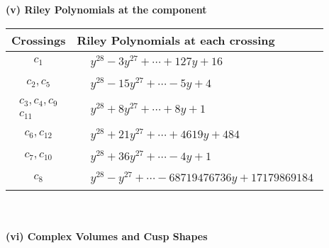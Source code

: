 \documentclass[1p]{elsarticle_modified}
\theoremstyle{definition}
\begin{document}
\newpage\renewcommand{\arraystretch}{1}
\flushleft \textbf{(v) Riley Polynomials at the component}\newline \\
\begin{tabular}{m{50pt}|m{274pt}}
Crossings & \hspace{64pt}Riley Polynomials at each crossing \\
\hline $$\begin{aligned}c_{1}\end{aligned}$$&$\begin{aligned}
&y^{28}-3 y^{27}+\cdots+127 y+16
\end{aligned}$\\
\hline $$\begin{aligned}c_{2},c_{5}\end{aligned}$$&$\begin{aligned}
&y^{28}-15 y^{27}+\cdots-5 y+4
\end{aligned}$\\
\hline $$\begin{aligned}c_{3},c_{4},c_{9}\\c_{11}\end{aligned}$$&$\begin{aligned}
&y^{28}+8 y^{27}+\cdots+8 y+1
\end{aligned}$\\
\hline $$\begin{aligned}c_{6},c_{12}\end{aligned}$$&$\begin{aligned}
&y^{28}+21 y^{27}+\cdots+4619 y+484
\end{aligned}$\\
\hline $$\begin{aligned}c_{7},c_{10}\end{aligned}$$&$\begin{aligned}
&y^{28}+36 y^{27}+\cdots-4 y+1
\end{aligned}$\\
\hline $$\begin{aligned}c_{8}\end{aligned}$$&$\begin{aligned}
&y^{28}- y^{27}+\cdots-68719476736 y+17179869184
\end{aligned}$\\
\hline
\end{tabular}\\~\\
\newpage\flushleft \textbf{(vi) Complex Volumes and Cusp Shapes}
\end{document}
